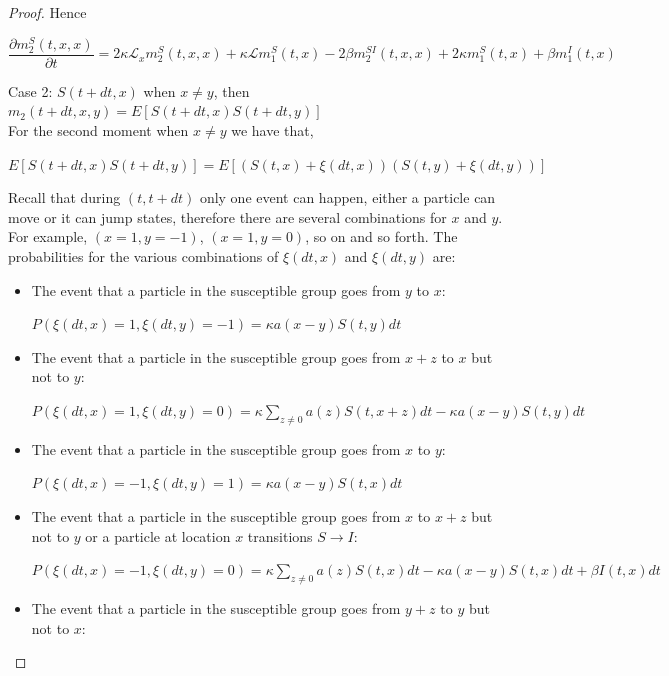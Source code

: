 \documentclass[sn-basic]{sn-jnl}%
\theoremstyle{thmstyleone}%
\theoremstyle{thmstyletwo}%
\theoremstyle{thmstylethree}%
\numberwithin{equation}{theorem}
\begin{document}
\begin{proof}
Hence
\begin{small}
\begin{equation*}
    \displaystyle \frac{\partial m_{2}^{S}(t,x,x)}{\partial t}= 2\kappa \mathcal{L}_{x}m_{2}^{S}(t,x,x) + \kappa \mathcal{L} m_{1}^{S}(t,x) - 2 \beta m_{2}^{SI}(t,x,x) + 2 \kappa m_{1}^{S}(t,x) + \beta m_{1}^{I}(t,x)
\end{equation*}
\end{small}
Case 2: $S(t+dt,x)$ when $x \neq y$, then $m_{2}(t+dt,x,y) = E[S(t+dt,x)S(t+dt,y)]$\\
For the second moment when $x \neq y$ we have that,
\begin{center}
$E[S(t+dt,x)S(t+dt,y)] = E[(S(t,x)+ \xi(dt,x))(S(t,y)+ \xi(dt,y))]$
\end{center}
Recall that during $(t, t+dt)$ only one event can happen, either a particle can move or it can jump states, therefore there are several combinations for $x$ and $y$. For example, $(x=1,y=-1)$, $(x=1,y=0)$, so on and so forth. The probabilities for the various combinations of $\xi(dt,x)$ and $\xi(dt,y)$ are:
\begin{itemize}
\item The event that a particle in the susceptible group goes from $y$ to $x$:
\begin{center}
$P(\xi(dt,x)= 1, \xi(dt,y)= -1)= \kappa a(x-y) S(t,y)dt$
\end{center}
\item The event that a particle in the susceptible group goes from $x+z$ to $x$ but not to $y$:
\begin{center}
$P(\xi(dt,x)= 1, \xi(dt,y)= 0)= \kappa \sum\limits_{z \neq 0} a(z) S(t,x+z)dt - \kappa a(x-y) S(t,y)dt$
\end{center}
\item The event that a particle in the susceptible group goes from $x$ to $y$:
\begin{center}
$P(\xi(dt,x)= -1, \xi(dt,y)= 1)= \kappa a(x-y) S(t,x)dt$
\end{center}
\item The event that a particle in the susceptible group goes from $x$ to $x+z$ but not to $y$ or a particle at location $x$ transitions $S \rightarrow I$:
\begin{center}
$P(\xi(dt,x)= -1, \xi(dt,y)= 0)= \kappa \sum\limits_{z \neq 0} a(z) S(t,x)dt - \kappa a(x-y) S(t,x)dt + \beta I(t,x)dt$
\end{center}
\item The event that a particle in the susceptible group goes from $y+z$ to $y$ but not to $x$:

\end{itemize}
\end{proof}
\end{document}
